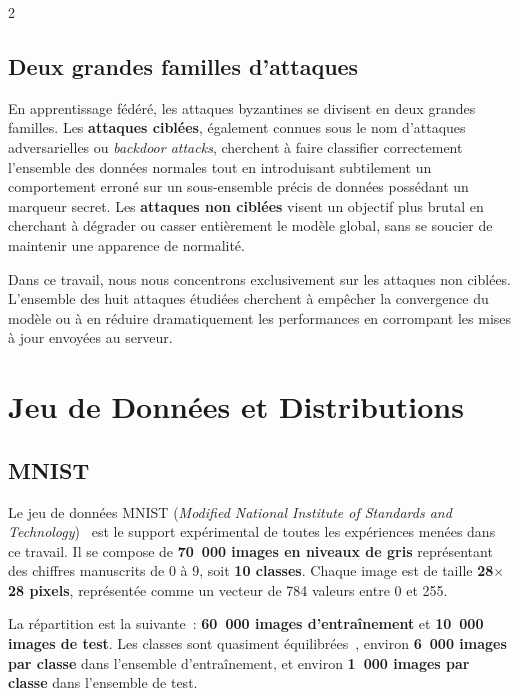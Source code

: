 \documentclass{article}
\begin{document}
\begin{multicols}{2}
\subsection{Deux grandes familles d'attaques}

En apprentissage f\'ed\'er\'e, les attaques byzantines se divisent en deux grandes familles. Les \textbf{attaques cibl\'ees}, \'egalement connues sous le nom d'attaques adversarielles ou \textit{backdoor attacks}, cherchent \`a faire classifier correctement l'ensemble des donn\'ees normales tout en introduisant subtilement un comportement erron\'e sur un sous-ensemble pr\'ecis de donn\'ees poss\'edant un marqueur secret. Les \textbf{attaques non cibl\'ees} visent un objectif plus brutal en cherchant \`a d\'egrader ou casser enti\`erement le mod\`ele global, sans se soucier de maintenir une apparence de normalit\'e.

Dans ce travail, nous nous concentrons exclusivement sur les attaques non cibl\'ees. L'ensemble des huit attaques \'etudi\'ees cherchent \`a emp\^echer la convergence du mod\`ele ou \`a en r\'eduire dramatiquement les performances en corrompant les mises \`a jour envoy\'ees au serveur.

\section{Jeu de Donn\'ees et Distributions}

\subsection{MNIST}

Le jeu de donn\'ees MNIST (\textit{Modified National Institute of Standards and
Technology})~\cite{lecun1998} est le support exp\'erimental de toutes les exp\'eriences
men\'ees dans ce travail. Il se compose de \textbf{70~000 images en niveaux de gris}
repr\'esentant des chiffres manuscrits de 0 \`a 9, soit \textbf{10 classes}. Chaque
image est de taille \textbf{28$\times$28 pixels}, repr\'esent\'ee comme un vecteur
de 784 valeurs entre 0 et 255.

La r\'epartition est la suivante~: \textbf{60~000 images d'entra\^inement} et \textbf{10~000
images de test}. Les classes sont quasiment \'equilibr\'ees~, environ \textbf{6~000 images
par classe} dans l'ensemble d'entra\^inement, et environ \textbf{1~000 images par classe}
dans l'ensemble de test.


\end{multicols}
\end{document}
